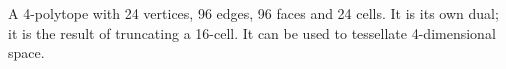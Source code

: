  A 4-polytope with 24 vertices, 96 edges, 96 faces and 24 cells.
It is its own dual; it is the result of truncating a 16-cell.
It can be used to tessellate 4-dimensional space.
